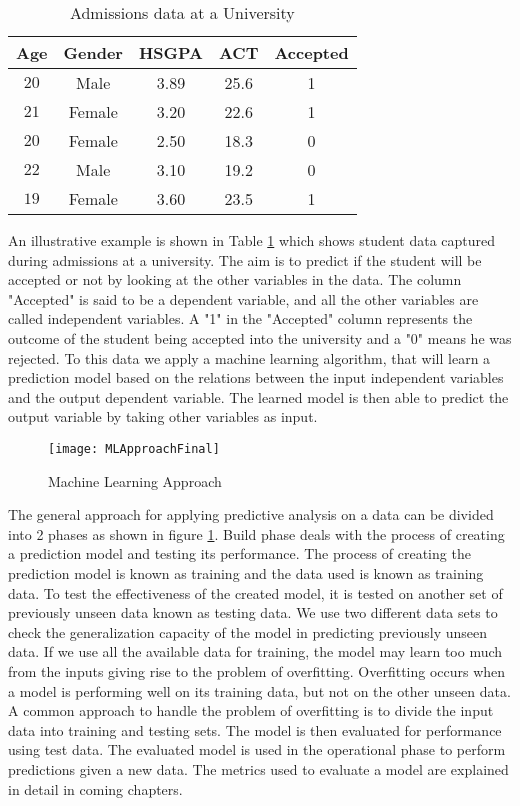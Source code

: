 \documentclass[11pt,openright]{report}
\begin{document}
 \begin{table}[!t]
	\renewcommand{\arraystretch}{1.3}
	\caption{Admissions data at a University}
	\label{table:example_db}
	\centering
	\begin{tabular}{|c|c|c|c|c|}
		\hline
		\bfseries Age & \bfseries Gender & \bfseries HSGPA & \bfseries ACT & \bfseries Accepted\\
		\hline
		$20$ & Male & 3.89 & 25.6 & 1\\ \hline
		$21$ & Female & 3.20 & 22.6 & 1\\ \hline
		$20$ & Female & 2.50 & 18.3 & 0\\ \hline
		$22$ & Male & 3.10 &  19.2 & 0\\ \hline
		$19$ & Female & 3.60 & 23.5 & 1\\ \hline
	\end{tabular}
\end{table}


An illustrative example is shown in Table \ref{table:example_db} which shows student data captured during admissions at a university. The aim is to predict if the student will be accepted or not by looking at the other variables in the data. The column "Accepted" is said to be a dependent variable, and all the other variables are called independent variables. A "1" in the "Accepted" column represents the outcome of the student being accepted into the university and a "0" means he was rejected. To this data we apply a machine learning algorithm, that will learn a prediction model based on the relations between the input independent variables and the output dependent variable. The learned model is then able to predict the output variable by taking other variables as input. 
  \begin{figure}
	\centering
	\texttt{[image: MLApproachFinal]}
	\caption{Machine Learning Approach}
	\label{fig:predictive_analysis-approach}
\end{figure} 

The general approach for applying predictive analysis on a data can be divided into 2 phases as shown in figure \ref{fig:predictive_analysis-approach}. Build phase deals with the process of creating a prediction model and testing its performance. The process of creating the prediction model is known as training and the data used is known as training data. To test the effectiveness of the created model, it is tested on another set of previously unseen data known as testing data. We use two different data sets to check the generalization capacity of the model in predicting previously unseen data. If we use all the available data for training, the model may learn too much from the inputs giving rise to the problem of overfitting. Overfitting occurs when a model is performing well on its training data, but not on the other unseen data. A common approach to handle the problem of overfitting is to divide the input data into training and testing sets. The model is then evaluated for performance using test data.  The evaluated model is used in the operational phase to perform predictions given a new data. The metrics used to evaluate a model are explained in detail in coming chapters.
\end{document}
